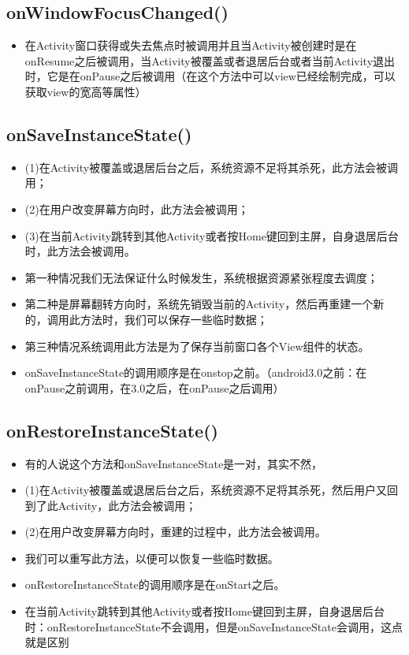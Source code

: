 \documentclass[9pt, b5paaper]{book}
\begin{document}
\subsection{onWindowFocusChanged()}
\label{sec-1-3-1}
\begin{itemize}
\item 在Activity窗口获得或失去焦点时被调用并且当Activity被创建时是在onResume之后被调用，当Activity被覆盖或者退居后台或者当前Activity退出时，它是在onPause之后被调用（在这个方法中可以view已经绘制完成，可以获取view的宽高等属性）
\end{itemize}
\subsection{onSaveInstanceState()}
\label{sec-1-3-2}
\begin{itemize}
\item (1)在Activity被覆盖或退居后台之后，系统资源不足将其杀死，此方法会被调用；
\item (2)在用户改变屏幕方向时，此方法会被调用；
\item (3)在当前Activity跳转到其他Activity或者按Home键回到主屏，自身退居后台时，此方法会被调用。
\item 第一种情况我们无法保证什么时候发生，系统根据资源紧张程度去调度；
\item 第二种是屏幕翻转方向时，系统先销毁当前的Activity，然后再重建一个新的，调用此方法时，我们可以保存一些临时数据；
\item 第三种情况系统调用此方法是为了保存当前窗口各个View组件的状态。
\item onSaveInstanceState的调用顺序是在onstop之前。（android3.0之前：在onPause之前调用，在3.0之后，在onPause之后调用）
\end{itemize}
\subsection{onRestoreInstanceState()}
\label{sec-1-3-3}
\begin{itemize}
\item 有的人说这个方法和onSaveInstanceState是一对，其实不然，
\item (1)在Activity被覆盖或退居后台之后，系统资源不足将其杀死，然后用户又回到了此Activity，此方法会被调用；
\item (2)在用户改变屏幕方向时，重建的过程中，此方法会被调用。
\item 我们可以重写此方法，以便可以恢复一些临时数据。
\item onRestoreInstanceState的调用顺序是在onStart之后。
\item 在当前Activity跳转到其他Activity或者按Home键回到主屏，自身退居后台时：onRestoreInstanceState不会调用，但是onSaveInstanceState会调用，这点就是区别
\end{itemize}
\end{document}

